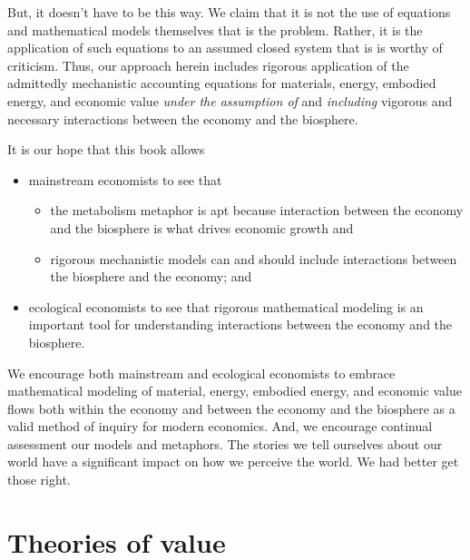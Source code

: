But, it doesn't have to be this way.
We claim that it is not the use of equations 
and mathematical models themselves that is the problem.
Rather, it is the application of such equations 
to an assumed closed system
that is is worthy of criticism.
Thus, our approach herein includes rigorous application of the 
admittedly mechanistic accounting equations 
for materials, energy, embodied energy, and economic value
\emph{under the assumption of} and \emph{including} 
vigorous and necessary interactions between
the economy and the biosphere.

It is our hope that this book allows

\begin{itemize}
	\item{mainstream economists to see that}
	\begin{itemize}
		\item{the metabolism metaphor is apt because 
		interaction between the economy and the biosphere is 
		what drives economic growth and}
		\item{rigorous mechanistic models can and should include 
		interactions between the biosphere and the economy; and} 
	\end{itemize}
	\item{ecological economists to see that rigorous mathematical modeling
	is an important tool for understanding interactions
	between the economy and the biosphere.}
\end{itemize}

We encourage both mainstream and ecological economists
to embrace mathematical modeling of 
material, 
energy, 
embodied energy, 
and economic value flows
both within the economy and between the economy and the biosphere
as a valid method of inquiry for modern economics.
And, we encourage continual assessment our models and metaphors.
The stories we tell ourselves about our world have a significant 
impact on how we perceive the world.
We had better get those right.


\section{Theories of value}
\label{sec:theory_of_value}

